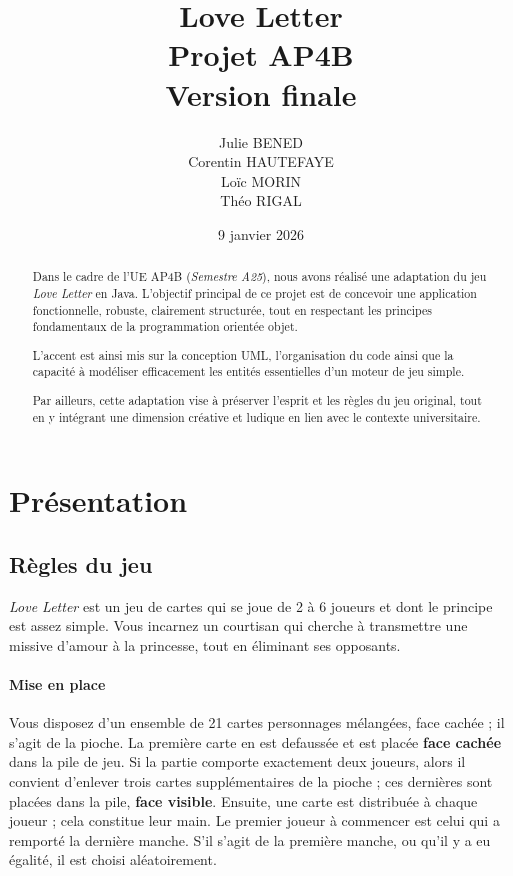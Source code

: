 \documentclass[paper=a4,fontsize=12pt,titlepage]{scrartcl}
\title{
    \Huge Love Letter\\
    \Large Projet AP4B\\
    \large Version finale
}
\author{
    Julie \textsc{BENED}\\
    Corentin \textsc{HAUTEFAYE}\\
    Loïc \textsc{MORIN}\\
    Théo \textsc{RIGAL}
}
\date{9 janvier 2026}
\begin{document}
    \maketitle

    \renewcommand*{\abstractname}{Introduction}
    \begin{abstract}
        \thispagestyle{plain}
        Dans le cadre de l'UE AP4B (\textit{Semestre A25}), nous avons réalisé une adaptation du jeu \textit{Love Letter}
        en Java. L'objectif principal de ce projet est de concevoir une application fonctionnelle, robuste,
        clairement structurée, tout en respectant les principes fondamentaux de la programmation orientée objet.

        L'accent est ainsi mis sur la conception UML, l'organisation du code ainsi que la capacité à modéliser
        efficacement les entités essentielles d'un moteur de jeu simple.

        Par ailleurs, cette adaptation vise à préserver l'esprit et les règles du jeu original, tout en y intégrant
        une dimension créative et ludique en lien avec le contexte universitaire.
    \end{abstract}

    \tableofcontents
    \clearpage
    \section{Présentation}\label{sec:presentation}
    \subsection{Règles du jeu}\label{subsec:definition-du-sujet}

    \textit{Love Letter} est un jeu de cartes qui se joue de 2 à 6 joueurs et dont le principe est assez simple.
    Vous incarnez un courtisan qui cherche à transmettre une missive d'amour à la princesse, tout en éliminant ses
    opposants.

    \paragraph{Mise en place} Vous disposez d'un ensemble de 21 cartes personnages mélangées, face cachée ; il s'agit de la pioche.
    La première carte en est defaussée et est placée \textbf{face cachée} dans la pile de jeu. Si la partie comporte
    exactement deux joueurs, alors il convient d'enlever trois cartes supplémentaires de la pioche ; ces dernières sont
    placées dans la pile, \textbf{face visible}. Ensuite, une carte est distribuée à chaque joueur ; cela constitue leur main.
    Le premier joueur à commencer est celui qui a remporté la dernière manche. S'il s'agit de la première manche,
    ou qu'il y a eu égalité, il est choisi aléatoirement.
\end{document}
